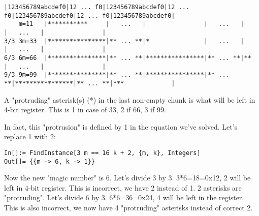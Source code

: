 \iffalse
\begin{lstlisting}[basicstyle=\tiny]
           |123456789abcdef0|123456789abcdef0|123456789abcdef0|123456789abcdef0|123456789abcdef0|123456789abcdef0|123456789abcdef0|
    m=11   |***********     |                |                |                |                |                |                |
3/3 3m=33  |****************|****************|*               |                |                |                |                |
6/3 6m=66  |****************|****************|****************|****************|**              |                |                |
9/3 9m=99  |****************|****************|****************|****************|****************|****************|***             |
\end{lstlisting}
\fi

\begin{lstlisting}[basicstyle=\footnotesize]
           |123456789abcdef0|12 ... f0|123456789abcdef0|12 ... f0|123456789abcdef0|12 ... f0|123456789abcdef0|
    m=11   |***********     |   ...   |                |   ...   |                |   ...   |                |
3/3 3m=33  |****************|** ... **|*               |   ...   |                |   ...   |                |
6/3 6m=66  |****************|** ... **|****************|** ... **|**              |   ...   |                |
9/3 9m=99  |****************|** ... **|****************|** ... **|****************|** ... **|***             |
\end{lstlisting}

A "protruding" asterisk(s) (*) in the last non-empty chunk is what will be left in 4-bit register.
This is 1 in case of 33, 2 if 66, 3 if 99.

In fact, this "protrusion" is defined by 1 in the equation we've solved.
Let's replace 1 with 2:

\begin{lstlisting}
In[]:= FindInstance[3 m == 16 k + 2, {m, k}, Integers]
Out[]= {{m -> 6, k -> 1}}
\end{lstlisting}

Now the new "magic number" is 6.
Let's divide 3 by 3. 3*6=18=0x12, 2 will be left in 4-bit register. This is incorrect, we have 2 instead of 1. 2 asterisks are "protruding".
Let's divide 6 by 3. 6*6=36=0x24, 4 will be left in the register. This is also incorrect, we now have 4 "protruding" asterisks instead of correct 2.

